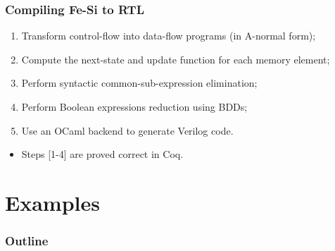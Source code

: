 \documentclass[9pt]{beamer}
\newcommand\fesi{Fe-Si}
\begin{document}
\begin{frame}[fragile]
  \frametitle{Compiling \fesi{} to RTL}
  
  \begin{enumerate}
  \item Transform control-flow into data-flow programs (in A-normal form);
  \item Compute the next-state and update function for each memory
    element;
  \item Perform syntactic common-sub-expression elimination;
  \item Perform Boolean expressions reduction using BDDs;
  \item Use an OCaml backend to generate Verilog code.
  \end{enumerate}

  \pause

  \begin{itemize}
  \item Steps [1-4] are proved correct in Coq.
  \end{itemize}
\end{frame}

\section{Examples}

\begin{frame}
  \frametitle{Outline}       
  \tableofcontents [currentsection] 
\end{frame}
\end{document}
